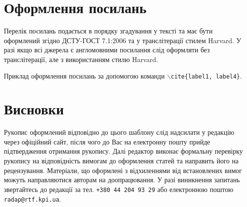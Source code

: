 \begin{multicols}{2}
\section{Оформлення посилань}

Перелік посилань подається в порядку згадування у тексті та має бути оформлений згідно ДСТУ-ГОСТ 7.1:2006 та у транслітерації стилем Harvard. У разі якщо всі джерела є англомовними посилання слід оформляти без транслітерації, але з використанням стилю Harvard.

Приклад оформлення посилань  \cite{ref1,ref4} за допомогою команди \texttt{$\backslash$cite\{label1, label4\}}. 



\section*{Висновки}
Рукопис оформлений відповідно до цього шаблону слід надсилати у редакцію через офіційний сайт, після чого до Вас на електронну пошту прийде підтвердження отримання рукопису. Далі редактор виконає формальну перевірку рукопису на відповідність вимогам до оформлення статей та направить його на рецензування. Матеріали, що оформлені з відхиленнями від встановлених вимог можуть направляютися авторам на доопрацювання. У разі виникнення запитань звертайтесь до редакції за тел. \texttt{+380 44 204 93 29} або електронною поштою \texttt{radap@rtf.kpi.ua}.




\end{multicols}
